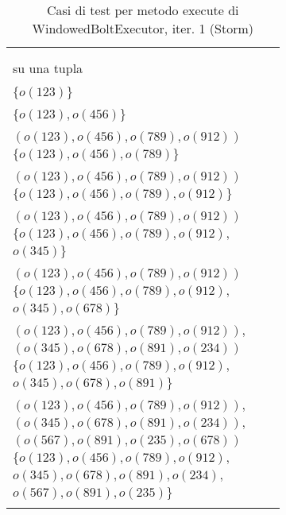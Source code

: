 \documentclass[10pt, a4paper]{article}
\newcommand{\Intmaketable}[4]{
	\begin{longtable}{#3}
	#4
	\caption{#2}
	\label{#1}
	\end{longtable}
}
\newcommand{\Inttestctable}[3]{
	\Intmaketable{#1}{#2}{|l|l|l|}{
	\hline
	\thead{Input} & \thead{Esito atteso} & \thead{Motivazione}\\
	\hline
	\hline
	#3
	\hline}
}
\newcommand{\Inttestccaption}[4]{Casi di test per metodo #1 di #2, iter. #3 (#4)}
\newcommand{\gettablelabel}[5]{table:#1:#2:#3:iter#4:proj#5}
\newcommand{\testctable}[5]{
	\Inttestctable{\gettablelabel{testc}{#1}{#2}{#3}{#4}}
		{\Inttestccaption{#1}{#2}{#3}{#4}}
		{#5}
}
\newcommand{\tcell}{\makecell[tl]}
\newcommand{\newtrow}{\\ \hline}
\def\storm{Storm}
\begin{document}
	\testctable{execute}{WindowedBoltExecutor}{1}{\storm}{
			\tcell{null} &
			\tcell{RuntimeException viene lanciata} &
			\tcell{} 
		\newtrow
			\tcell{makeTuple(123)} &
			\tcell{Nessuna tupla di finestre} &
			\tcell{Nessun pre-esecuzione del bolt\\ su una tupla} 
		\newtrow
			\tcell{makeTuple(456)} &
			\tcell{Nessuna tupla di finestre} &
			\tcell{Pre-esecuzione del bolt su tupla\\$\{o(123)\}$} 
		\newtrow
			\tcell{makeTuple(789)} &
			\tcell{Nessuna tupla di finestre} &
			\tcell{Pre-esecuzione del bolt su tuple\\$\{o(123),o(456)\}$} 
		\newtrow
			\tcell{makeTuple(912)} &
			\tcell{Una finestra di tuple:\\$(o(123),o(456),o(789),o(912))$} &
			\tcell{Pre-esecuzione del bolt su tuple\\$\{o(123),o(456),o(789)\}$} 
		\newtrow
			\tcell{makeTuple(345)} &
			\tcell{Una finestra di tuple:\\$(o(123),o(456),o(789),o(912))$} &
			\tcell{Pre-esecuzione del bolt su tuple\\$\{o(123),o(456),o(789),o(912)\}$} 
		\newtrow
			\tcell{makeTuple(678)} &
			\tcell{Una finestra di tuple:\\$(o(123),o(456),o(789),o(912))$} &
			\tcell{Pre-esecuzione del bolt su tuple\\$\{o(123),o(456),o(789),o(912),$\\$o(345)\}$} 
		\newtrow
			\tcell{makeTuple(891)} &
			\tcell{Una finestra di tuple:\\$(o(123),o(456),o(789),o(912))$} &
			\tcell{Pre-esecuzione del bolt su tuple\\$\{o(123),o(456),o(789),o(912),$\\$o(345),o(678)\}$} 
		\newtrow
			\tcell{makeTuple(234)} &
			\tcell{Due finestre di tuple:
				\\$(o(123),o(456),o(789),o(912)),$\\$(o(345),o(678),o(891),o(234))$} &
			\tcell{Pre-esecuzione del bolt su tuple\\$\{o(123),o(456),o(789),o(912),$\\$o(345),o(678),o(891)\}$} 
		\newtrow
			\tcell{makeTuple(678)} &
			\tcell{Tre finestre di tuple:
				\\$(o(123),o(456),o(789),o(912)),$\\$(o(345),o(678),o(891),o(234)),$\\
				$(o(567),o(891),o(235),o(678))$} &
			\tcell{Pre-esecuzione del bolt su tuple\\$\{o(123),o(456),o(789),o(912),$\\$o(345),o(678),o(891),o(234),$\\
				$o(567),o(891),o(235)\}$} 
		\newtrow
	}
	
\end{document}
